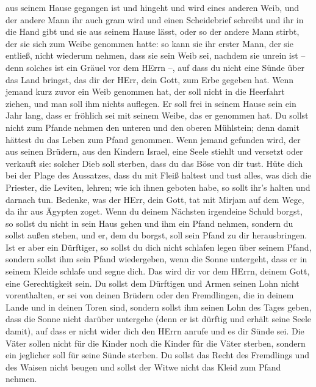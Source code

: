aus seinem Hause gegangen ist und hingeht und wird eines anderen Weib,
 und der andere Mann ihr auch gram wird und einen
Scheidebrief schreibt und ihr in die Hand gibt und sie aus seinem Hause
lässt, oder so der andere Mann stirbt, der sie sich zum Weibe genommen
hatte:  so kann sie ihr erster Mann, der sie entließ, nicht
wiederum nehmen, dass sie sein Weib sei, nachdem sie unrein ist -- denn
solches ist ein Gräuel vor dem HErrn --, auf dass du nicht eine Sünde
über das Land bringst, das dir der HErr, dein Gott, zum Erbe gegeben
hat.  Wenn jemand kurz zuvor ein Weib genommen hat, der soll
nicht in die Heerfahrt ziehen, und man soll ihm nichts auflegen. Er soll
frei in seinem Hause sein ein Jahr lang, dass er fröhlich sei mit seinem
Weibe, das er genommen hat.  Du sollst nicht zum Pfande
nehmen den unteren und den oberen Mühlstein; denn damit hättest du das
Leben zum Pfand genommen.  Wenn jemand gefunden wird, der
aus seinen Brüdern, aus den Kindern Israel, eine Seele stiehlt und
versetzt oder verkauft sie: solcher Dieb soll sterben, dass du das Böse
von dir tust.  Hüte dich bei der Plage des Aussatzes, dass
du mit Fleiß haltest und tust alles, was dich die Priester, die Leviten,
lehren; wie ich ihnen geboten habe, so sollt ihr's halten und darnach
tun.  Bedenke, was der HErr, dein Gott, tat mit Mirjam auf
dem Wege, da ihr aus Ägypten zoget.  Wenn du deinem
Nächsten irgendeine Schuld borgst, so sollst du nicht in sein Haus gehen
und ihm ein Pfand nehmen,  sondern du sollst außen stehen,
und er, dem du borgst, soll sein Pfand zu dir herausbringen.
 Ist er aber ein Dürftiger, so sollst du dich nicht
schlafen legen über seinem Pfand,  sondern sollst ihm sein
Pfand wiedergeben, wenn die Sonne untergeht, dass er in seinem Kleide
schlafe und segne dich. Das wird dir vor dem HErrn, deinem Gott, eine
Gerechtigkeit sein.  Du sollst dem Dürftigen und Armen
seinen Lohn nicht vorenthalten, er sei von deinen Brüdern oder den
Fremdlingen, die in deinem Lande und in deinen Toren sind, 
sondern sollst ihm seinen Lohn des Tages geben, dass die Sonne nicht
darüber untergehe (denn er ist dürftig und erhält seine Seele damit),
auf dass er nicht wider dich den HErrn anrufe und es dir Sünde sei.
 Die Väter sollen nicht für die Kinder noch die Kinder für
die Väter sterben, sondern ein jeglicher soll für seine Sünde sterben.
 Du sollst das Recht des Fremdlings und des Waisen nicht
beugen und sollst der Witwe nicht das Kleid zum Pfand nehmen.
